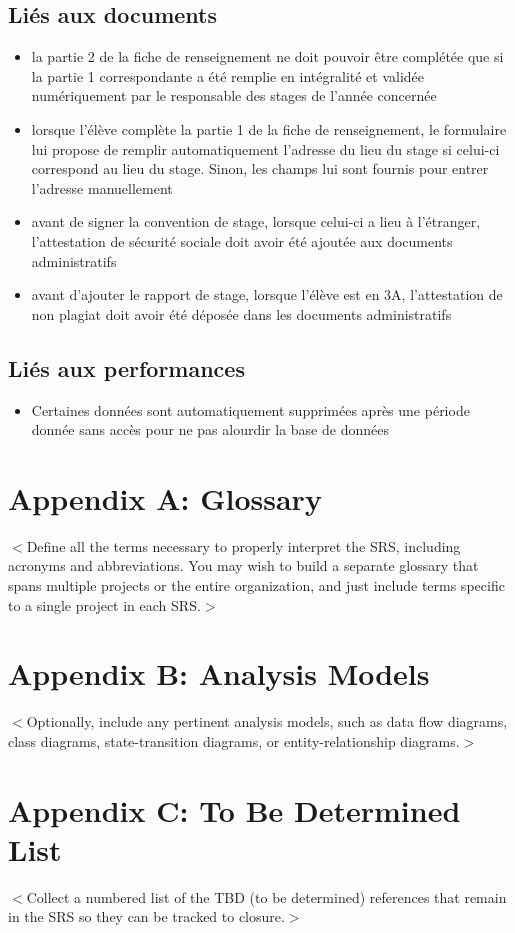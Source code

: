 \documentclass{scrreprt}
\begin{document}
\subsection{Li\'es aux documents}
\begin{itemize}
\item la partie 2 de la fiche de renseignement ne doit pouvoir \^etre compl\'et\'ee que si la partie 1 correspondante a \'et\'e remplie en int\'egralit\'e et valid\'ee num\'eriquement par le responsable des stages de l’ann\'ee concern\'ee
\item lorsque l’\'el\`eve compl\`ete la partie 1 de la fiche de renseignement, le formulaire lui propose de remplir automatiquement l’adresse du lieu du stage si celui-ci correspond au lieu du stage. Sinon, les champs lui sont fournis pour entrer l’adresse manuellement
\item avant de signer la convention de stage, lorsque celui-ci a lieu à l’\'etranger, l’attestation de s\'ecurit\'e sociale doit avoir \'et\'e ajout\'ee aux documents administratifs
\item avant d’ajouter le rapport de stage, lorsque l’\'el\`eve est en 3A, l’attestation de non plagiat doit avoir \'et\'e d\'epos\'ee dans les documents administratifs
\end{itemize}
 
\subsection{Li\'es aux performances}
\begin{itemize}
\item Certaines donn\'ees sont automatiquement supprim\'ees apr\`es une p\'eriode donn\'ee sans acc\`es pour ne pas alourdir la base de donn\'ees
\end{itemize}


\section{Appendix A: Glossary}
$<$Define all the terms necessary to properly interpret the SRS, including 
acronyms and abbreviations. You may wish to build a separate glossary that spans 
multiple projects or the entire organization, and just include terms specific to 
a single project in each SRS.$>$

\section{Appendix B: Analysis Models}
$<$Optionally, include any pertinent analysis models, such as data flow 
diagrams, class diagrams, state-transition diagrams, or entity-relationship 
diagrams.$>$

\section{Appendix C: To Be Determined List}
$<$Collect a numbered list of the TBD (to be determined) references that remain 
in the SRS so they can be tracked to closure.$>$
\end{document}
